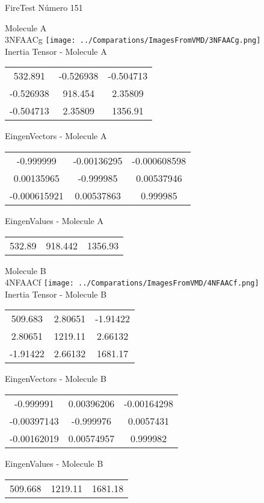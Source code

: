 \vtab[-2cm]
\begin{center}
{\large FireTest \tab Número 151}
\end{center}
\begin{multicols}{2}
\begin{center}

Molecule A \\ 
3NFAACg
\texttt{[image: ../Comparations/ImagesFromVMD/3NFAACg.png]}
\\
Inertia Tensor - Molecule A \\
\vtab

\begin{tabular}{|c c c|}
532.891	 & 	-0.526938	 & 	-0.504713	 \\
-0.526938	 & 	918.454	 & 	2.35809	 \\
-0.504713	 & 	2.35809	 & 	1356.91
\end{tabular}

\vtab
 EingenVectors - Molecule A     \\
\vtab
\begin{tabular}{|c c c|}
-0.999999	 & 	-0.00136295	 & 	-0.000608598	 \\
0.00135965	 & 	-0.999985	 & 	0.00537946	 \\
-0.000615921	 & 	0.00537863	 & 	0.999985
\end{tabular}

\vtab
 EingenValues - Molecule A     \\
\vtab
\begin{tabular}{|c c c|}
532.89	 & 	918.442	 & 	1356.93	 \\
\end{tabular}
\columnbreak

Molecule B \\ 
4NFAACf
\texttt{[image: ../Comparations/ImagesFromVMD/4NFAACf.png]}
\\
Inertia Tensor - Molecule B \\
\vtab

\begin{tabular}{|c c c|}
509.683	 & 	2.80651	 & 	-1.91422	 \\
2.80651	 & 	1219.11	 & 	2.66132	 \\
-1.91422	 & 	2.66132	 & 	1681.17
\end{tabular}

\vtab
 EingenVectors - Molecule B     \\
\vtab
\begin{tabular}{|c c c|}
-0.999991	 & 	0.00396206	 & 	-0.00164298	 \\
-0.00397143	 & 	-0.999976	 & 	0.0057431	 \\
-0.00162019	 & 	0.00574957	 & 	0.999982
\end{tabular}

\vtab
 EingenValues - Molecule B     \\
\vtab
\begin{tabular}{|c c c|}
509.668	 & 	1219.11	 & 	1681.18	 \\
\end{tabular}

\end{center}
\end{multicols}
